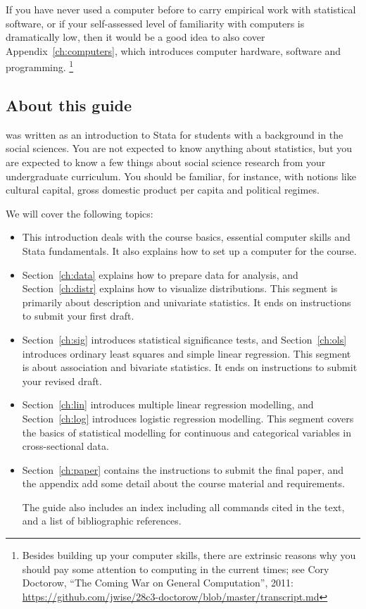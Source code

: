   If you have never used a computer before to carry empirical work with statistical software, or if your self-assessed level of familiarity with computers is dramatically low, then it would be a good idea to also cover Appendix~\ref{ch:computers}, which introduces computer hardware, software and programming.%
  \footnote{Besides building up your computer skills, there are extrinsic reasons why you should pay some attention to computing in the current times; see Cory Doctorow, ``The Coming War on General Computation'', 2011: \url{https://github.com/jwise/28c3-doctorow/blob/master/transcript.md}}%

%
\subsection{About this guide}%
	 was written as an introduction to Stata for students with a background in the social sciences. You are not expected to know anything about statistics, but you are expected to know a few things about social science research from your undergraduate curriculum. You should be familiar, for instance, with notions like cultural capital, gross domestic product per capita and political regimes.%

	We will cover the following topics:%

	\begin{itemize}
		\item This introduction deals with the course basics, essential computer skills and Stata fundamentals. It also explains how to set up a computer for the course.%
	
		\item %
		Section~\ref{ch:data} explains how to prepare data for analysis, and %
		Section~\ref{ch:distr} explains how to visualize distributions. This segment is primarily about description and univariate statistics. %
    It ends on instructions to submit your first draft.
	
		\item %
		Section~\ref{ch:sig} introduces statistical significance tests, and %
		Section~\ref{ch:ols} introduces ordinary least squares and simple linear regression. This segment is about association and bivariate statistics. %
    It ends on instructions to submit your revised draft.

		\item %
		Section~\ref{ch:lin} introduces multiple linear regression modelling, and %
		Section~\ref{ch:log} introduces logistic regression modelling. This segment covers the basics of statistical modelling for continuous and categorical variables in cross-sectional data. %

		\item %
		Section~\ref{ch:paper} contains the instructions to submit the final paper, and the appendix add some detail about the course material and requirements.%
    
    The guide also includes an index including all commands cited in the text, and a list of bibliographic references.%
	\end{itemize}

